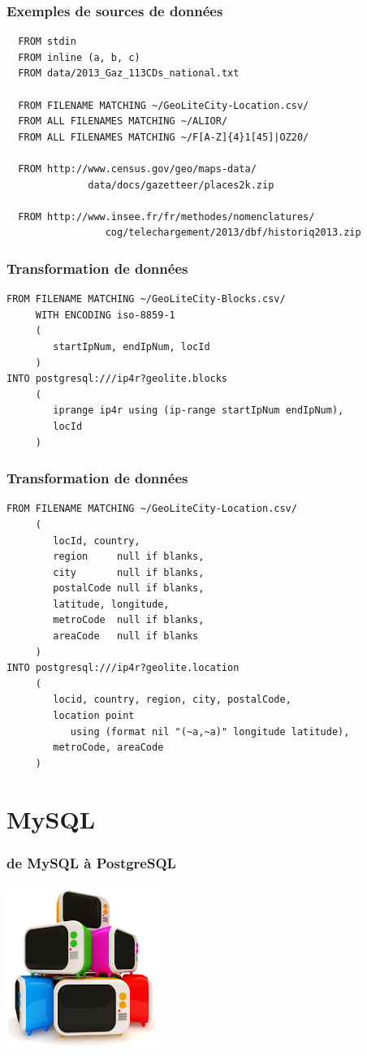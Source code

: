 \documentclass{beamer}
\begin{document}
\begin{frame}[fragile]
  \frametitle{Exemples de sources de données}

  \begin{verbatim}
  FROM stdin
  FROM inline (a, b, c)
  FROM data/2013_Gaz_113CDs_national.txt
  
  FROM FILENAME MATCHING ~/GeoLiteCity-Location.csv/
  FROM ALL FILENAMES MATCHING ~/ALIOR/
  FROM ALL FILENAMES MATCHING ~/F[A-Z]{4}1[45]|OZ20/
  
  FROM http://www.census.gov/geo/maps-data/
              data/docs/gazetteer/places2k.zip
  
  FROM http://www.insee.fr/fr/methodes/nomenclatures/
                 cog/telechargement/2013/dbf/historiq2013.zip
\end{verbatim}
\end{frame}

\begin{frame}[fragile]
  \frametitle{Transformation de données}

  \begin{verbatim}
FROM FILENAME MATCHING ~/GeoLiteCity-Blocks.csv/
     WITH ENCODING iso-8859-1
     (
        startIpNum, endIpNum, locId
     )
INTO postgresql:///ip4r?geolite.blocks
     (
        iprange ip4r using (ip-range startIpNum endIpNum),
        locId
     )
  \end{verbatim}
\end{frame}

\begin{frame}[fragile]
  \frametitle{Transformation de données}

  \begin{verbatim}
FROM FILENAME MATCHING ~/GeoLiteCity-Location.csv/
     (
        locId, country,
        region     null if blanks,
        city       null if blanks,
        postalCode null if blanks,
        latitude, longitude,
        metroCode  null if blanks,
        areaCode   null if blanks
     )
INTO postgresql:///ip4r?geolite.location
     (
        locid, country, region, city, postalCode,
        location point
           using (format nil "(~a,~a)" longitude latitude),
        metroCode, areaCode
     )
  \end{verbatim}
\end{frame}

\section{MySQL}

\begin{frame}
  \frametitle{de MySQL à PostgreSQL}

  
  \begin{center}
    \includegraphics[height=2.1in]{tv.png}
  \end{center}
\end{frame}
\end{document}
